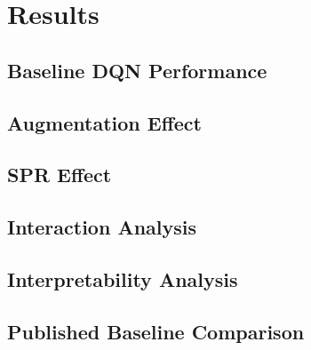 \chapter{Results}
\label{ch:results}

\section{Baseline DQN Performance}
\label{sec:baseline-results}

\section{Augmentation Effect}
\label{sec:augmentation-results}

\section{SPR Effect}
\label{sec:spr-results}

\section{Interaction Analysis}
\label{sec:interaction-results}

\section{Interpretability Analysis}
\label{sec:interpretability-results}

\section{Published Baseline Comparison}
\label{sec:published-comparison}
